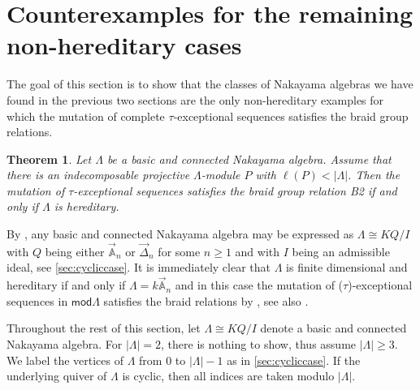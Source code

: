 \documentclass[11pt]{amsart}
\newcommand{\mods}{\mathsf{mod}}
\newcommand{\A}{\mathbb{A}}
\newtheorem{theorem}{Theorem}[section]
\theoremstyle{definition}
\begin{document}
\section{Counterexamples for the remaining non-hereditary cases}
The goal of this section is to show that the classes of Nakayama algebras we have found in the previous two sections are the only non-hereditary examples for which the mutation of complete $\tau$-exceptional sequences satisfies the braid group relations.

\begin{theorem}\label{thm:notethm1}
    Let $\Lambda$ be a basic and connected Nakayama algebra. Assume that there is an indecomposable projective $\Lambda$-module $P$ with $\ell(P) < |\Lambda|$. Then the mutation of $\tau$-exceptional sequences satisfies the braid group relation \textnormal{B2} if and only if $\Lambda$ is hereditary. 
\end{theorem}

By \cite[Thm. V.3.2]{assem_skowronski_simson_2006}, any basic and connected Nakayama algebra may be expressed as $\Lambda \cong KQ/I$ with $Q$ being either $\overrightarrow{\A}_n$ or $\overrightarrow{\Delta}_n$ for some $n \geq 1$ and with $I$ being an admissible ideal, see \cref{sec:cycliccase}. It is immediately clear that $\Lambda$ is finite dimensional and hereditary if and only if $\Lambda = k \overrightarrow{\A}_n$ and in this case the mutation of ($\tau$)-exceptional sequences in $\mods \Lambda$ satisfies the braid relations by \cite{cbw92,ringel_exceptional}, see also \cite[Thm. 0.5]{BHM2024}. 

Throughout the rest of this section, let $\Lambda \cong KQ/I$ denote a basic and connected Nakayama algebra. For $|\Lambda|=2$, there is nothing to show, thus assume $|\Lambda| \geq 3$. We label the vertices of $\Lambda$ from $0$ to $|\Lambda|-1$ as in \cref{sec:cycliccase}. If the underlying quiver of $\Lambda$ is cyclic, then all indices are taken modulo $|\Lambda|$. 
\end{document}
